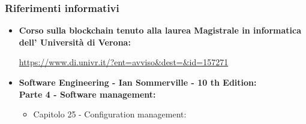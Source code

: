 \subsubsection{Riferimenti informativi}
\begin {itemize}
\item \textbf{Corso sulla blockchain\glo{} tenuto alla laurea Magistrale in informatica dell' Università di Verona:}
\begin{center}
    \url{https://www.di.univr.it/?ent=avviso&dest=&id=157271}
\end{center}

\item \textbf{Software Engineering - Ian Sommerville - 10 th Edition:\\
    Parte 4 - Software management:}
\begin{itemize}
    \item Capitolo 25 - Configuration management:


\end{itemize}
\end{itemize}
